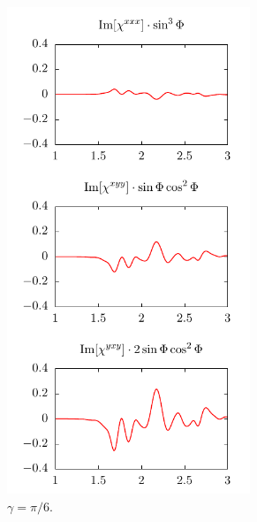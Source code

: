 \documentclass[aps,prb,10pt,letterpaper,notitlepage]{revtex4-1}
\begin{document}
\begin{figure}[b]
\begin{subfigure}[b]{0.25\textwidth}
        \includegraphics[width=0.8\textwidth]{rot/comps30.pdf}
        \caption{$\gamma = \pi/6$.}
    \end{subfigure}
    ~ 
    \begin{subfigure}[b]{0.25\textwidth}

\end{subfigure}
\end{figure}
\end{document}
